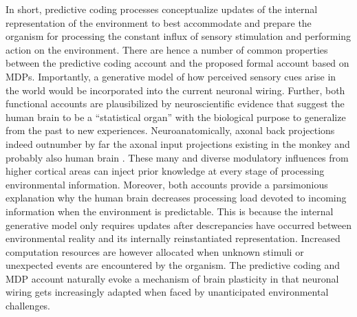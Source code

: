 \documentclass[10pt,letterpaper]{article}
\begin{document}
In short, predictive coding processes
conceptualize updates of the internal representation of the environment
to best accommodate and prepare the organism
for processing the constant influx of sensory stimulation and
performing action on the environment.
There are hence a number of common properties
between the predictive coding account
and the proposed formal account based on MDPs.
Importantly,
a generative model of how perceived sensory cues arise in the
world would be incorporated into
the current neuronal wiring.
Further,
both functional accounts are plausibilized by
neuroscientific evidence that suggest
the human brain to be a ``statistical organ'' \citep{friston2014phantastic}
with the biological purpose to
generalize from the past to new experiences.
Neuroanatomically, axonal
back projections indeed outnumber by far the axonal input projections
existing in the monkey and probably also human brain
\citep{salin1995corticocortical}.
These many and diverse modulatory influences from higher cortical areas
can inject prior knowledge
at every stage of processing environmental information.
Moreover,
both accounts provide a parsimonious explanation why the
human brain decreases processing load devoted to incoming information
when the environment is predictable.
This is because the internal generative
model only requires updates after descrepancies have occurred between
environmental reality and its internally reinstantiated representation.
Increased computation resources are however allocated
when unknown stimuli or
unexpected events are encountered by the organism.
The predictive coding and MDP account
naturally evoke a mechanism of brain plasticity in that
neuronal wiring gets increasingly adapted
when faced by unanticipated environmental challenges.
\end{document}
